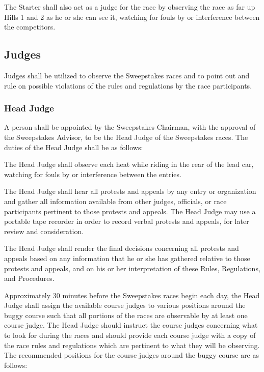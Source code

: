 	The Starter shall also act as a judge for the race by observing the race as far
	up Hills 1 and 2 as he or she can see it, watching for fouls by or interference
	between the competitors.

\subsection{Judges}

	Judges shall be utilized to observe the Sweepstakes races and to point out and
	rule on possible violations of the rules and regulations by the race
	participants.

\subsubsection{Head Judge}

	A person shall be appointed by the Sweepstakes Chairman, with the approval of
	the Sweepstakes Advisor, to be the Head Judge of the Sweepstakes races. The
	duties of the Head Judge shall be as follows:

	The Head Judge shall observe each heat while riding in the rear of the lead
	car, watching for fouls by or interference between the entries.

	The Head Judge shall hear all protests and appeals by any entry or organization
	and gather all information available from other judges, officials, or race
	participants pertinent to those protests and appeals. The Head Judge may use a
	portable tape recorder in order to record verbal protests and appeals, for
	later review and consideration.

	The Head Judge shall render the final decisions concerning all protests and
	appeals based on any information that he or she has gathered relative to those
	protests and appeals, and on his or her interpretation of these Rules,
	Regulations, and Procedures.

	Approximately 30 minutes before the Sweepstakes races begin each day, the Head
	Judge shall assign the available course judges to various positions around the
	buggy course such that all portions of the races are observable by at least one
	course judge. The Head Judge should instruct the course judges concerning what
	to look for during the races and should provide each course judge with a copy
	of the race rules and regulations which are pertinent to what they will be
	observing. The recommended positions for the course judges around the buggy
	course are as follows:

